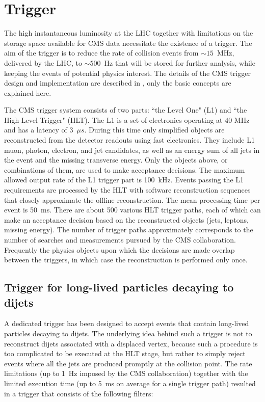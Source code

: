 \section{Trigger}

The high instantaneous luminosity at the LHC together with limitations on the storage space available for
CMS data necessitate the existence of a trigger.
 The aim of the trigger is to reduce the rate
of collision events from $\sim15$~MHz, delivered by the LHC, to $\sim500$~Hz that will be stored
for further analysis, while keeping the events of potential physics interest.
The details of the CMS trigger design and implementation are described in \cite{Cittolin:578006},
only the basic concepts are explained here. 

The CMS trigger system consists of two parts: ``the Level One" (L1) and ``the High Level Trigger" (HLT).
The L1 is a set of electronics operating at 40 MHz and has a latency of 3~$\mu s$. During this
time only simplified 
objects are reconstructed from the detector readouts using fast electronics.
 They include L1 muon, photon, 
electron, and jet candidates, as well as an energy sum of all jets in the event 
and the missing transverse energy.
Only the objects above, or combinations of them, are used to make acceptance decisions. 
The maximum allowed output
rate of the L1 trigger part is 100~kHz. Events passing the L1 requirements are processed by the
HLT with 
software reconstruction sequences that closely approximate
the offline reconstruction. The mean processing time per event is 50~ms. 
There are about 
500 various HLT trigger paths, each of which can make an acceptance decision based 
on the reconstructed objects
(jets, leptons, missing energy). The number of trigger paths approximately corresponds to the
number of searches and measurements pursued by the CMS collaboration.
Frequently the physics objects
upon which the decisions are made overlap between the triggers, in which case the reconstruction 
is performed only once.


\subsection{Trigger for long-lived particles decaying to dijets}
\label{subsec:trigger}

A dedicated trigger has been designed to accept events that contain long-lived particles 
decaying to dijets. 
The underlying idea behind such a trigger is not to reconstruct dijets
associated with a displaced vertex, because such a procedure is too complicated to be executed 
at the HLT stage, but rather to simply reject events where all the jets are produced promptly at the collision
point. The rate limitations (up to 1~Hz imposed by the CMS collaboration)
 together with the limited execution time (up to 5~ms on average for a single trigger path)
resulted in a trigger that consists of the following filters:

